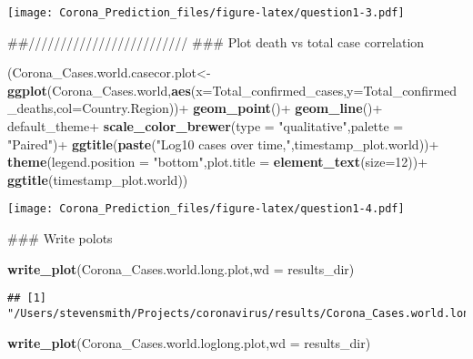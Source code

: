 \documentclass[]{article}
\newenvironment{Shaded}{\begin{snugshade}}{\end{snugshade}}
\newcommand{\KeywordTok}[1]{\textcolor[rgb]{0.13,0.29,0.53}{\textbf{{#1}}}}
\newcommand{\DataTypeTok}[1]{\textcolor[rgb]{0.13,0.29,0.53}{{#1}}}
\newcommand{\DecValTok}[1]{\textcolor[rgb]{0.00,0.00,0.81}{{#1}}}
\newcommand{\StringTok}[1]{\textcolor[rgb]{0.31,0.60,0.02}{{#1}}}
\newcommand{\NormalTok}[1]{{#1}}
\begin{document}
\texttt{[image: Corona\_Prediction\_files/figure-latex/question1-3.pdf]}

\begin{Shaded}
\begin{Highlighting}[]
\NormalTok{##/////////////////////////}
\NormalTok{### Plot death vs total case correlation}

\NormalTok{(Corona_Cases.world.casecor.plot<-}\KeywordTok{ggplot}\NormalTok{(Corona_Cases.world,}\KeywordTok{aes}\NormalTok{(}\DataTypeTok{x=}\NormalTok{Total_confirmed_cases,}\DataTypeTok{y=}\NormalTok{Total_confirmed_deaths,}\DataTypeTok{col=}\NormalTok{Country.Region))+}
\StringTok{  }\KeywordTok{geom_point}\NormalTok{()+}
\StringTok{  }\KeywordTok{geom_line}\NormalTok{()+}
\StringTok{  }\NormalTok{default_theme+}
\StringTok{  }\KeywordTok{scale_color_brewer}\NormalTok{(}\DataTypeTok{type =} \StringTok{"qualitative"}\NormalTok{,}\DataTypeTok{palette =} \StringTok{"Paired"}\NormalTok{)+}
\StringTok{  }\KeywordTok{ggtitle}\NormalTok{(}\KeywordTok{paste}\NormalTok{(}\StringTok{"Log10 cases over time,"}\NormalTok{,timestamp_plot.world))+}
\StringTok{  }\KeywordTok{theme}\NormalTok{(}\DataTypeTok{legend.position =} \StringTok{"bottom"}\NormalTok{,}\DataTypeTok{plot.title =} \KeywordTok{element_text}\NormalTok{(}\DataTypeTok{size=}\DecValTok{12}\NormalTok{))+}
\StringTok{    }\KeywordTok{ggtitle}\NormalTok{(timestamp_plot.world))}
\end{Highlighting}
\end{Shaded}

\texttt{[image: Corona\_Prediction\_files/figure-latex/question1-4.pdf]}

\begin{Shaded}
\begin{Highlighting}[]
\NormalTok{### Write polots}

\KeywordTok{write_plot}\NormalTok{(Corona_Cases.world.long.plot,}\DataTypeTok{wd =} \NormalTok{results_dir)}
\end{Highlighting}
\end{Shaded}

\begin{verbatim}
## [1] "/Users/stevensmith/Projects/coronavirus/results/Corona_Cases.world.long.plot.png"
\end{verbatim}

\begin{Shaded}
\begin{Highlighting}[]
\KeywordTok{write_plot}\NormalTok{(Corona_Cases.world.loglong.plot,}\DataTypeTok{wd =} \NormalTok{results_dir)}
\end{Highlighting}
\end{Shaded}
\end{document}
